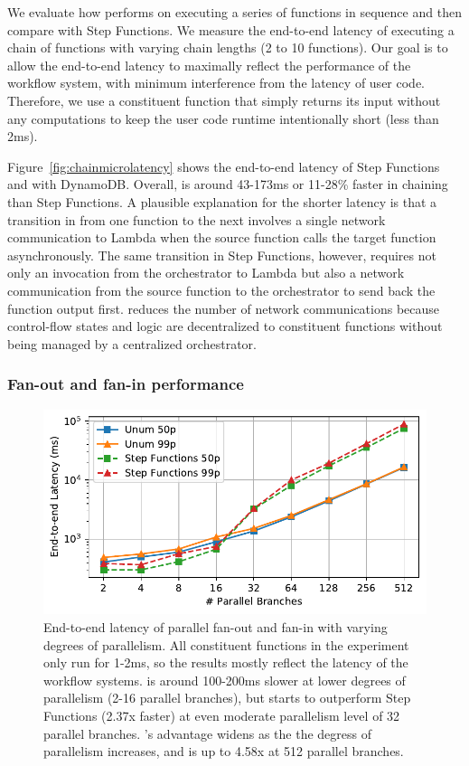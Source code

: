 We evaluate how \name{} performs on executing a series of functions in
sequence and then compare with Step Functions. We measure the end-to-end
latency of executing a chain of functions with varying chain lengths (2 to 10
functions). Our goal is to allow the end-to-end latency to maximally reflect
the performance of the workflow system, with minimum interference from the
latency of user code. Therefore, we use a constituent function that simply
returns its input without any computations to keep the user code runtime
intentionally short (less than 2ms).

Figure~\ref{fig:chainmicrolatency} shows the end-to-end latency of Step
Functions and \name{} with DynamoDB. Overall, \name{} is around 43-173ms or
11-28\% faster in chaining than Step Functions. A plausible explanation for
the shorter latency is that a transition in \name{} from one function to the
next involves a single network communication to Lambda when the source
function calls the target function asynchronously. The same transition in Step
Functions, however, requires not only an invocation from the orchestrator to
Lambda but also a network communication from the source function to the
orchestrator to send back the function output first. \name{} reduces
the number of network communications because control-flow states and logic are
decentralized to constituent functions without being managed by a centralized
orchestrator.

\subsubsection{Fan-out and fan-in performance}\label{sec:eval:fan-out}

\begin{figure}[t]
  \centering
  \includegraphics[width=\columnwidth]{figures/MapMicroLatency.pdf}
  \caption{End-to-end latency of parallel fan-out and fan-in with varying
    degrees of parallelism. All constituent functions in the experiment only
    run for 1-2ms, so the results mostly reflect the latency of the workflow
    systems. \name{} is around 100-200ms slower at lower degrees of
    parallelism (2-16 parallel branches), but starts to outperform Step
    Functions (2.37x faster) at even moderate parallelism level of 32 parallel
    branches. \name{}'s advantage widens as the the degress of parallelism
    increases, and is up to 4.58x at 512 parallel branches.}
  \label{fig:mapmicrolatency}
\end{figure}

